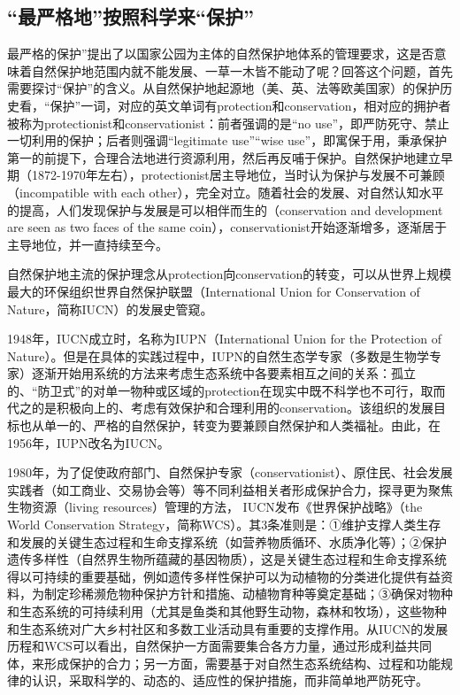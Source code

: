 \documentclass[]{book}
\begin{document}
\hypertarget{ux6700ux4e25ux683cux5730ux6309ux7167ux79d1ux5b66ux6765ux4fddux62a4}{%
\subsection{``最严格地''按照科学来``保护''}\label{ux6700ux4e25ux683cux5730ux6309ux7167ux79d1ux5b66ux6765ux4fddux62a4}}

最严格的保护''提出了以国家公园为主体的自然保护地体系的管理要求，这是否意味着自然保护地范围内就不能发展、一草一木皆不能动了呢？回答这个问题，首先需要探讨``保护''的含义。从自然保护地起源地（美、英、法等欧美国家）的保护历史看，``保护''一词，对应的英文单词有protection和conservation，相对应的拥护者被称为protectionist和conservationist：前者强调的是``no use''，即严防死守、禁止一切利用的保护；后者则强调``legitimate use''``wise use''，即寓保于用，秉承保护第一的前提下，合理合法地进行资源利用，然后再反哺于保护。自然保护地建立早期（1872-1970年左右），protectionist居主导地位，当时认为保护与发展不可兼顾（incompatible with each other），完全对立。随着社会的发展、对自然认知水平的提高，人们发现保护与发展是可以相伴而生的（conservation and development are seen as two faces of the same coin），conservationist开始逐渐增多，逐渐居于主导地位，并一直持续至今。

自然保护地主流的保护理念从protection向conservation的转变，可以从世界上规模最大的环保组织世界自然保护联盟（International Union for Conservation of Nature，简称IUCN）的发展史管窥。

1948年，IUCN成立时，名称为IUPN（International Union for the Protection of Nature）。但是在具体的实践过程中，IUPN的自然生态学专家（多数是生物学专家）逐渐开始用系统的方法来考虑生态系统中各要素相互之间的关系：孤立的、``防卫式''的对单一物种或区域的protection在现实中既不科学也不可行，取而代之的是积极向上的、考虑有效保护和合理利用的conservation。该组织的发展目标也从单一的、严格的自然保护，转变为要兼顾自然保护和人类福祉。由此，在1956年，IUPN改名为IUCN。

1980年，为了促使政府部门、自然保护专家（conservationist）、原住民、社会发展实践者（如工商业、交易协会等）等不同利益相关者形成保护合力，探寻更为聚焦生物资源（living resources）管理的方法， IUCN发布《世界保护战略》（the World Conservation Strategy，简称WCS）。其3条准则是：①维护支撑人类生存和发展的关键生态过程和生命支撑系统（如营养物质循环、水质净化等）；②保护遗传多样性（自然界生物所蕴藏的基因物质），这是关键生态过程和生命支撑系统得以可持续的重要基础，例如遗传多样性保护可以为动植物的分类进化提供有益资料，为制定珍稀濒危物种保护方针和措施、动植物育种等奠定基础；③确保对物种和生态系统的可持续利用（尤其是鱼类和其他野生动物，森林和牧场），这些物种和生态系统对广大乡村社区和多数工业活动具有重要的支撑作用。从IUCN的发展历程和WCS可以看出，自然保护一方面需要集合各方力量，通过形成利益共同体，来形成保护的合力；另一方面，需要基于对自然生态系统结构、过程和功能规律的认识，采取科学的、动态的、适应性的保护措施，而非简单地严防死守。
\end{document}
